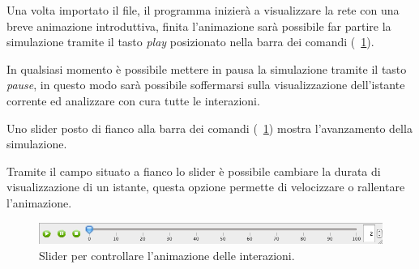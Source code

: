 \documentclass[a4paper,12pt]{article}
\begin{document}
Una volta importato il file, il programma inizier\`a a visualizzare la rete con una breve animazione introduttiva, finita l'animazione sar\`a possibile far partire la simulazione tramite il tasto \textit{play} posizionato nella barra dei comandi (\figurename~\ref{fig:slider}). 

In qualsiasi momento \`e possibile mettere in pausa la simulazione tramite il tasto \textit{pause}, in questo modo sar\`a possibile soffermarsi sulla visualizzazione dell'istante corrente ed analizzare con cura tutte le interazioni.

Uno slider posto di fianco alla barra dei comandi (\figurename~\ref{fig:slider}) mostra l'avanzamento della simulazione. 

Tramite il campo situato a fianco lo slider \`e possibile cambiare la durata di visualizzazione di un istante, questa opzione permette di velocizzare o rallentare l'animazione.
 
\begin{figure}[htb!]
 \begin{center}
  \includegraphics[width=\textwidth]{images/image1.png}
 \end{center}
 \caption{Slider per controllare l'animazione delle interazioni.}
 \label{fig:slider}
\end{figure}
 
\end{document}
